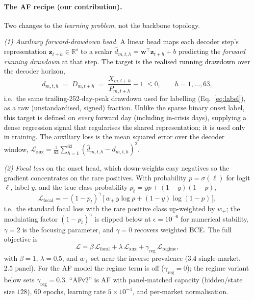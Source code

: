 \documentclass[11pt,a4paper]{article}
\begin{document}
\paragraph{The AF recipe (our contribution).} Two changes to the
\emph{learning problem}, not the backbone topology.

\emph{(1) Auxiliary forward-drawdown head.} A linear head maps each decoder
step's representation $\mathbf{z}_{t+h}\in\mathbb{R}^{s}$ to a scalar
$\hat d_{m,t,h}=\mathbf{w}^{\top}\mathbf{z}_{t+h}+b$ predicting the
\emph{forward running drawdown} at that step. The target is the realised
running drawdown over the decoder horizon,
\begin{equation}
d_{m,t,h}\;=\;D_{m,t+h}\;=\;\frac{X_{m,t+h}}{P_{m,t+h}}-1\;\le 0,
\qquad h=1,\dots,63,
\label{eq:auxtarget}
\end{equation}
i.e.\ the same trailing-252-day-peak drawdown used for labelling
(Eq.~\ref{eq:label}), as a raw (unstandardised, signed) fraction. Unlike the
sparse binary onset label, this target is defined on \emph{every} forward day
(including in-crisis days), supplying a dense regression signal that
regularises the shared representation; it is used only in training. The
auxiliary loss is the mean squared error over the decoder window,
$\mathcal{L}_{\mathrm{aux}}=\frac{1}{63}\sum_{h=1}^{63}(\hat d_{m,t,h}-d_{m,t,h})^2$.

\emph{(2) Focal loss} \citep{lin2017focal} on the onset head, which
down-weights easy negatives so the gradient concentrates on the rare positives.
With probability $p=\sigma(\ell)$ for logit $\ell$, label $y$, and the
true-class probability $p_t=yp+(1{-}y)(1{-}p)$,
\begin{equation}
\mathcal{L}_{\mathrm{focal}}=-\,(1-p_t)^{\gamma}\,
\big[\,w_{+}\,y\log p+(1-y)\log(1-p)\,\big],
\label{eq:focal}
\end{equation}
i.e.\ the standard focal loss with the rare positive class up-weighted by
$w_{+}$; the modulating factor $(1-p_t)^{\gamma}$ is clipped below at
$\epsilon=10^{-6}$ for numerical stability, $\gamma=2$ is the focusing
parameter, and $\gamma=0$ recovers weighted BCE. The full objective is
\begin{equation}
\mathcal{L}=\beta\,\mathcal{L}_{\mathrm{focal}}
+\lambda\,\mathcal{L}_{\mathrm{aux}}
+\gamma_{\mathrm{reg}}\,\mathcal{L}_{\mathrm{regime}},
\label{eq:loss}
\end{equation}
with $\beta=1$, $\lambda=0.5$, and $w_{+}$ set near the inverse prevalence
($3.4$ single-market, $2.5$ panel). For the AF model the regime term is off
($\gamma_{\mathrm{reg}}=0$); the regime variant below sets
$\gamma_{\mathrm{reg}}=0.3$. ``AFv2'' is AF with panel-matched capacity
(hidden/state size $128$), $60$ epochs, learning rate $5\times10^{-4}$, and
per-market normalisation.
\end{document}
